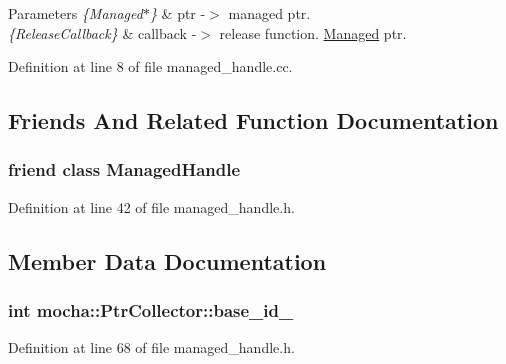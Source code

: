 \begin{DoxyParams}{Parameters}
{\em \{Managed$\ast$\}} & ptr -\/$>$ managed ptr. \\
\hline
{\em \{ReleaseCallback\}} & callback -\/$>$ release function. \hyperlink{classmocha_1_1_managed}{Managed} ptr. \\
\hline
\end{DoxyParams}


Definition at line 8 of file managed\_\-handle.cc.



\subsection{Friends And Related Function Documentation}
\hypertarget{classmocha_1_1_ptr_collector_a102b7b383e0de8f3e612201cac01a458}{
\subsubsection[{ManagedHandle}]{\setlength{\rightskip}{0pt plus 5cm}friend class {\bf ManagedHandle}}}
\label{classmocha_1_1_ptr_collector_a102b7b383e0de8f3e612201cac01a458}


Definition at line 42 of file managed\_\-handle.h.



\subsection{Member Data Documentation}
\hypertarget{classmocha_1_1_ptr_collector_a2b40c7e0ba9f7e616ac2dfe227d35da7}{
\subsubsection[{base\_\-id\_\-}]{\setlength{\rightskip}{0pt plus 5cm}int {\bf mocha::PtrCollector::base\_\-id\_\-}}}
\label{classmocha_1_1_ptr_collector_a2b40c7e0ba9f7e616ac2dfe227d35da7}


Definition at line 68 of file managed\_\-handle.h.

